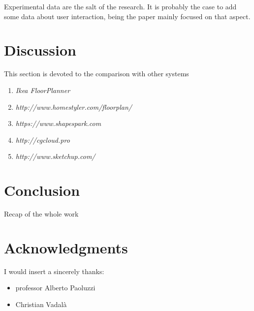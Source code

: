 \documentclass{sigchi}
\begin{document}
Experimental data are the salt of the research. It is probably the case to add some data about user interaction, being the paper mainly focused on that aspect.



\section{Discussion}  %
\label{sec:discussion}

This section is devoted to the comparison with other systems

\begin{enumerate}
  \item \em{Ikea FloorPlanner}
  \item \em{http://www.homestyler.com/floorplan/}
  \item \em{https://www.shapespark.com}
  \item \em{http://cgcloud.pro}
  \item \em{http://www.sketchup.com/}
\end{enumerate}



\section{Conclusion}  %
\label{sec:conclusion}

Recap of the whole work



\section{Acknowledgments}  %
\label{sec:acknowledgments}

I would insert a sincerely thanks:

\begin{itemize}
  \item professor Alberto Paoluzzi
  \item Christian Vadalà
\end{itemize}


%
%
%
%
%
\balance



\end{document}
